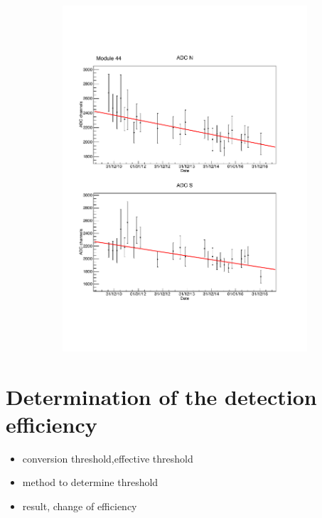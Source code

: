 \begin{figure}[ht]
\begin{subfigure}{0.5\linewidth}
    \includegraphics[width=\linewidth{}]{./fig/MPV_M44.pdf}
    \caption{}
    \label{fig:MPV_M44}
  \end{subfigure}
\end{figure}





\section{Determination of the detection efficiency}


\begin{itemize}
  \item conversion threshold,effective threshold
  \item method to determine threshold
  \item result, change of efficiency
\end{itemize}

